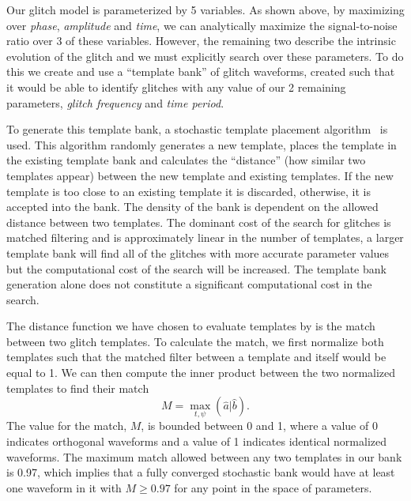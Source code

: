 Our \scl{} glitch model is parameterized by 5 variables. As shown above, by maximizing over \emph{phase}, \emph{amplitude} and \emph{time}, we can analytically maximize the signal-to-noise ratio over 3 of these variables. However, the remaining two describe the intrinsic evolution of the glitch and we must explicitly search over these parameters. To do this we create and use a ``template bank'' of \scl{} glitch waveforms, created such that it would be able to identify glitches with any value of our 2 remaining parameters, \emph{glitch frequency} and \emph{time period}.

To generate this template bank, a stochastic template placement algorithm~\cite{Harry_sbank:2009} is used. This algorithm randomly generates a new template, places the template in the existing template bank and calculates the ``distance'' (how similar two templates appear) between the new template and existing templates. If the new template is too close to an existing template it is discarded, otherwise, it is accepted into the bank. The density of the bank is dependent on the allowed distance between two templates. The dominant cost of the search for \scl{} glitches is matched filtering and is approximately linear in the number of templates, a larger template bank will find all of the glitches with more accurate parameter values but the computational cost of the search will be increased. The template bank generation alone does not constitute a significant computational cost in the search.

The distance function we have chosen to evaluate templates by is the match between two glitch templates. To calculate the match, we first normalize both templates such that the matched filter between a template and itself would be equal to 1. We can then compute the inner product between the two normalized templates to find their match
%
\begin{equation}
    M = \max_{t, \psi} (\hat{a} | \hat{b}).
  \label{4:eqn:match}
\end{equation}
%
The value for the match, $M$,  is bounded between 0 and 1, where a value of 0 indicates orthogonal waveforms and a value of 1 indicates identical normalized waveforms. The maximum match allowed between any two templates in our bank is 0.97, which implies that a fully converged stochastic bank would have at least one waveform in it with $M \geq 0.97$ for any point in the space of parameters. 

